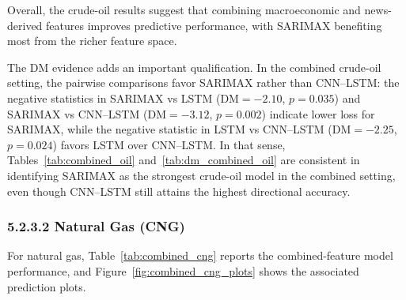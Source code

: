 \documentclass[pdflatex,sn-mathphys-num]{sn-jnl}%
\theoremstyle{thmstyleone}%
\theoremstyle{thmstyletwo}%
\theoremstyle{thmstylethree}%
\begin{document}
Overall, the crude-oil results suggest that combining macroeconomic and news-derived features improves predictive performance, with SARIMAX benefiting most from the richer feature space.

The DM evidence adds an important qualification. In the combined crude-oil setting, the pairwise comparisons favor SARIMAX rather than CNN--LSTM: the negative statistics in SARIMAX vs LSTM ($\mathrm{DM}=-2.10$, $p=0.035$) and SARIMAX vs CNN--LSTM ($\mathrm{DM}=-3.12$, $p=0.002$) indicate lower loss for SARIMAX, while the negative statistic in LSTM vs CNN--LSTM ($\mathrm{DM}=-2.25$, $p=0.024$) favors LSTM over CNN--LSTM. In that sense, Tables~\ref{tab:combined_oil} and~\ref{tab:dm_combined_oil} are consistent in identifying SARIMAX as the strongest crude-oil model in the combined setting, even though CNN--LSTM still attains the highest directional accuracy.

\subsubsection*{5.2.3.2 Natural Gas (CNG)}
For natural gas, Table~\ref{tab:combined_cng} reports the combined-feature model performance, and Figure~\ref{fig:combined_cng_plots} shows the associated prediction plots.
\end{document}
